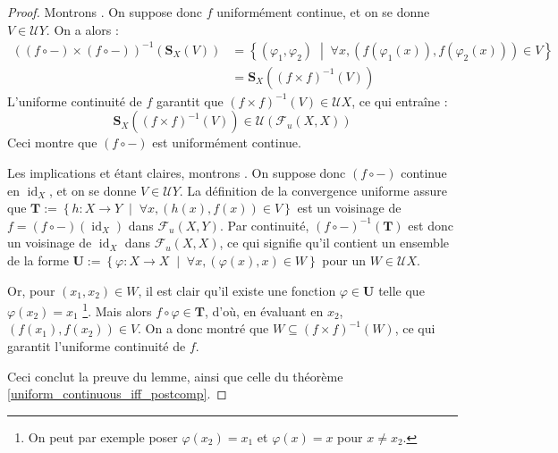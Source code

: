 \documentclass[a4paper,12pt]{article}
\newcommand{\set}[1]{\left\{ #1 \right\}}
\newcommand{\tq}{\;\middle|\;}
\newcommand{\inv}{^{-1}}
\newcommand{\comp}{\circ}
\renewcommand{\implies}{\Rightarrow}
\newcommand{\blank}{{-}}
\DeclareMathOperator{\id}{id}
\begin{document}
\begin{proof}
    Montrons \framebox{$(i)\implies(ii)$}. On suppose donc $f$ uniformément continue, et on se donne $V\in\mathcal{U}Y$. On a alors :
    \begin{align*}
        ((f\comp\blank)\times(f\comp\blank))\inv(\mathbf{S}_X(V)) 
            &= \set{(\varphi_1, \varphi_2)\tq\forall x, (f(\varphi_1(x)), f(\varphi_2(x)))\in V} \\
            &= \mathbf{S}_X((f\times f)\inv(V))
    \end{align*}
    L'uniforme continuité de $f$ garantit que $(f\times f)\inv(V)\in\mathcal{U}X$, ce qui entraîne :
    \begin{equation*}
        \mathbf{S}_X((f\times f)\inv(V))\in\mathcal{U}(\mathcal{F}_u(X, X))
    \end{equation*}
    Ceci montre que $(f\comp\blank)$ est uniformément continue.

    Les implications \framebox{$(ii)\implies(iii)$} et \framebox{$(iii)\implies(iv)$} étant claires, montrons
    \framebox{$(iv)\implies(i)$}. On suppose donc $(f\comp\blank)$ continue en $\id_X$, et on se donne 
    $V\in\mathcal{U}Y$. La définition de la convergence uniforme assure que 
    $\mathbf{T}:=\set{h : X\to Y\tq \forall x, (h(x), f(x))\in V}$ est un voisinage de $f = (f\comp\blank)(\id_X)$ dans 
    $\mathcal{F}_u(X, Y)$. Par continuité, $(f\comp\blank)\inv(\mathbf{T})$ est donc un voisinage de $\id_X$ dans $\mathcal{F}_u(X, X)$,
    ce qui signifie qu'il contient un ensemble de la forme $\mathbf{U}:=\set{\varphi : X\to X\tq \forall x, (\varphi(x), x)\in W}$ pour 
    un $W\in\mathcal{U}X$. 
    
    Or, pour $(x_1, x_2)\in W$, il est clair qu'il existe une fonction $\varphi\in\mathbf{U}$ telle que $\varphi(x_2) = x_1$
    \footnote{On peut par exemple poser $\varphi(x_2)=x_1$ et $\varphi(x) = x$ pour $x\ne x_2$.}.
    Mais alors $f\comp\varphi\in\mathbf{T}$, d'où, en évaluant en $x_2$, $(f(x_1),f(x_2))\in V$.
    On a donc montré que $W\subseteq (f\times f)\inv(W)$, ce qui garantit l'uniforme continuité de $f$.

    Ceci conclut la preuve du lemme, ainsi que celle du théorème \ref{uniform_continuous_iff_postcomp}.
\end{proof}

\clearpage

\nocite{*}



\end{document}
